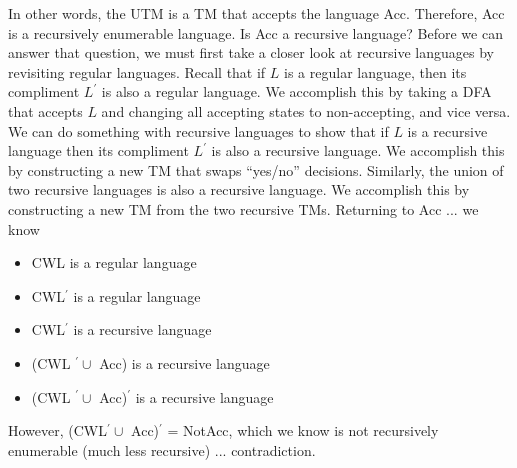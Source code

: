 \documentclass{report}
\begin{document}
\begin{itemize}
\begin{enumerate}
            \end{enumerate}
            \bigbreak \noindent 
            In other words, the UTM is a TM that accepts the language Acc. Therefore, Acc is a recursively enumerable language.
            \bigbreak \noindent 
            Is Acc a recursive language?
            \bigbreak \noindent 
            Before we can answer that question, we must first take a closer look at recursive languages by revisiting regular languages.
            \bigbreak \noindent 
            Recall that if $L$ is a regular language, then its compliment $L^{\prime}$ is also a regular language.
            \bigbreak \noindent 
            We accomplish this by taking a DFA that accepts $L$ and changing all accepting states to non-accepting, and vice versa.
            \bigbreak \noindent 
            We can do something with recursive languages to show that if $L$ is a recursive language then its compliment $L^{\prime}$ is also a recursive language.
            \bigbreak \noindent 
            We accomplish this by constructing a new TM that swaps “yes/no” decisions.
            \bigbreak \noindent 
            \bigbreak \noindent 
            Similarly, the union of two recursive languages is also a recursive language. We accomplish this by constructing a new TM from the two recursive TMs.
            \bigbreak \noindent 
            \bigbreak \noindent 
            Returning to Acc ... we know
            \begin{itemize}
               \item CWL is a regular language
                \item CWL$^{\prime}$ is a regular language
                \item CWL$^{\prime}$ is a recursive language
            \end{itemize}
            \bigbreak \noindent 
            \begin{itemize}
                \item (CWL $^{\prime} \cup $  Acc) is a recursive language
                \item (CWL $^{\prime} \cup $ Acc)$^{\prime}$ is a recursive language 
            \end{itemize}
            \bigbreak \noindent 
            \bigbreak \noindent 
            However, (CWL$^{\prime} \cup $ Acc)$^{\prime}$ = NotAcc, which we know is not recursively enumerable (much less recursive) ... contradiction.

\end{itemize}
\end{document}
